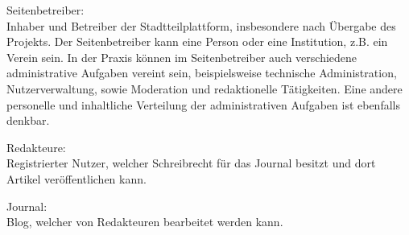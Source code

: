 \documentclass{swp}
\begin{document}
Seitenbetreiber:\\Inhaber und Betreiber der Stadtteilplattform, insbesondere nach \"Ubergabe des Projekts. Der Seitenbetreiber kann eine Person oder eine Institution, z.B. ein Verein sein. In der Praxis k\"onnen im Seitenbetreiber auch verschiedene administrative Aufgaben vereint sein, beispielsweise technische Administration, Nutzerverwaltung, sowie Moderation und redaktionelle T\"atigkeiten. Eine andere personelle und inhaltliche Verteilung der administrativen Aufgaben ist ebenfalls denkbar.

Redakteure:\\Registrierter Nutzer, welcher Schreibrecht f\"ur das Journal besitzt und dort Artikel ver\"offentlichen kann.

Journal:\\Blog, welcher von Redakteuren bearbeitet werden kann.
\end{document}

